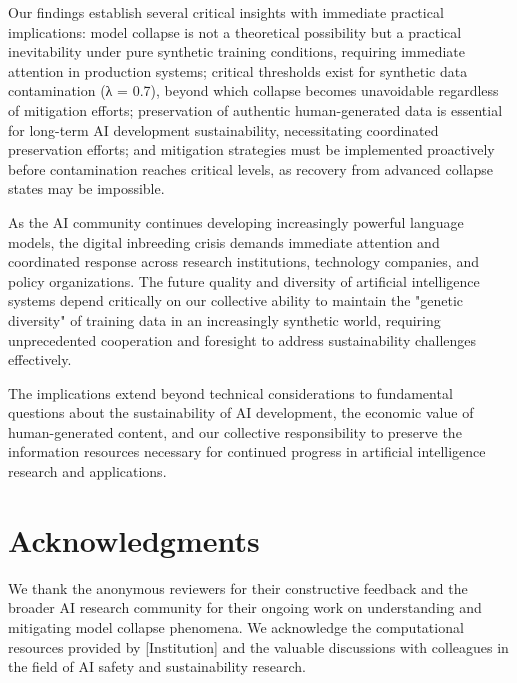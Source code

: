 \documentclass{article}
\begin{document}
Our findings establish several critical insights with immediate practical implications: model collapse is not a theoretical possibility but a practical inevitability under pure synthetic training conditions, requiring immediate attention in production systems; critical thresholds exist for synthetic data contamination (λ = 0.7), beyond which collapse becomes unavoidable regardless of mitigation efforts; preservation of authentic human-generated data is essential for long-term AI development sustainability, necessitating coordinated preservation efforts; and mitigation strategies must be implemented proactively before contamination reaches critical levels, as recovery from advanced collapse states may be impossible.

As the AI community continues developing increasingly powerful language models, the digital inbreeding crisis demands immediate attention and coordinated response across research institutions, technology companies, and policy organizations. The future quality and diversity of artificial intelligence systems depend critically on our collective ability to maintain the "genetic diversity" of training data in an increasingly synthetic world, requiring unprecedented cooperation and foresight to address sustainability challenges effectively.

The implications extend beyond technical considerations to fundamental questions about the sustainability of AI development, the economic value of human-generated content, and our collective responsibility to preserve the information resources necessary for continued progress in artificial intelligence research and applications.

\section*{Acknowledgments}

We thank the anonymous reviewers for their constructive feedback and the broader AI research community for their ongoing work on understanding and mitigating model collapse phenomena. We acknowledge the computational resources provided by [Institution] and the valuable discussions with colleagues in the field of AI safety and sustainability research.



\end{document}
